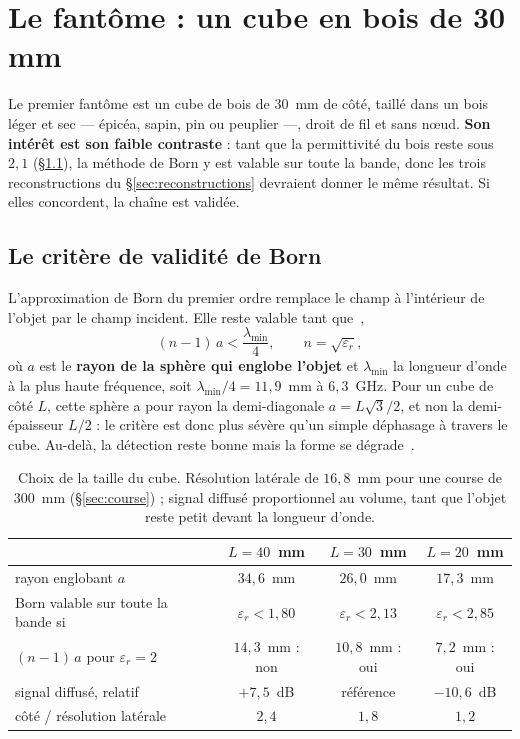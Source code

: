 \documentclass[11pt,a4paper]{article}
\newcommand{\eps}{\varepsilon_r}
\begin{document}
\section{Le fantôme : un cube en bois de 30 mm}
\label{sec:fantome}

Le premier fantôme est un cube de bois de $30$~mm de côté, taillé dans un bois
léger et sec --- épicéa, sapin, pin ou peuplier ---, droit de fil et sans nœud.
\textbf{Son intérêt est son faible contraste} : tant que la permittivité du bois
reste sous $2{,}1$ (\S\ref{sec:born}), la méthode de Born y est valable sur toute
la bande, donc les trois reconstructions du
\S\ref{sec:reconstructions} devraient donner le même résultat. Si elles
concordent, la chaîne est validée.

\subsection{Le critère de validité de Born}
\label{sec:born}

L'approximation de Born du premier ordre remplace le champ à l'intérieur de
l'objet par le champ incident. Elle reste valable tant
que~\cite{slaney1984}, \cite[éq.~24]{amineh2011}
\[
  (n-1)\,a < \frac{\lambda_{\min}}{4}, \qquad n = \sqrt{\eps},
\]
où $a$ est le \textbf{rayon de la sphère qui englobe l'objet} et
$\lambda_{\min}$ la longueur d'onde à la plus haute fréquence, soit
$\lambda_{\min}/4 = 11{,}9$~mm à $6{,}3$~GHz. Pour un cube de côté $L$, cette
sphère a pour rayon la demi-diagonale $a = L\sqrt{3}/2$, et non la
demi-épaisseur $L/2$ : le critère est donc plus sévère qu'un simple déphasage à
travers le cube. Au-delà, la détection reste bonne mais la forme se
dégrade~\cite{amineh2011}.

\begin{table}[H]
\centering
\begin{tabular}{lccc}
\toprule
 & $L = 40$~mm & {\boldmath $L = 30$}~\textbf{mm} & $L = 20$~mm \\
\midrule
rayon englobant $a$ & $34{,}6$~mm & $26{,}0$~mm & $17{,}3$~mm \\
Born valable sur toute la bande si & $\eps < 1{,}80$
  & {\boldmath $\eps < 2{,}13$} & $\eps < 2{,}85$ \\
$(n-1)\,a$ pour $\eps = 2$ & $14{,}3$~mm : non & $10{,}8$~mm : oui
  & $7{,}2$~mm : oui \\
signal diffusé, relatif & $+7{,}5$~dB & référence & $-10{,}6$~dB \\
côté / résolution latérale & $2{,}4$ & $1{,}8$ & $1{,}2$ \\
\bottomrule
\end{tabular}
\caption{Choix de la taille du cube. Résolution latérale de $16{,}8$~mm pour une
course de $300$~mm (\S\ref{sec:course}) ; signal diffusé proportionnel au volume,
tant que l'objet reste petit devant la longueur d'onde.}
\label{tab:taille}
\end{table}
\end{document}
